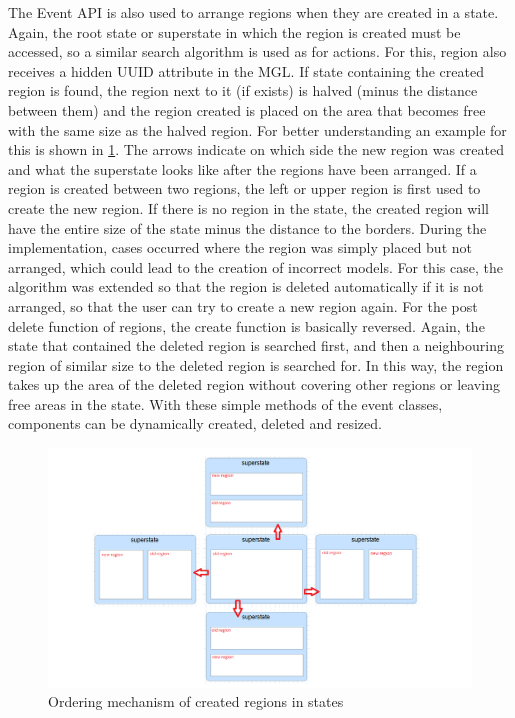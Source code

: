 The Event API is also used to arrange regions when they are created in a state. Again, the root state or superstate in which the region is created must be accessed, so a similar search algorithm is used as for actions. For this, region also receives a hidden UUID attribute in the MGL. If state containing the created region is found, the region next to it (if exists) is halved (minus the distance between them) and the region created is placed on the area that becomes free with the same size as the halved region. For better understanding an example for this is shown in \ref{fig:Event_region}. The arrows indicate on which side the new region was created and what the superstate looks like after the regions have been arranged. If a region is created between two regions, the left or upper region is first used to create the new region. If there is no region in the state, the created region will have the entire size of the state minus the distance to the borders. During the implementation, cases occurred where the region was simply placed but not arranged, which could lead to the creation of incorrect models. For this case, the algorithm was extended so that the region is deleted automatically if it is not arranged, so that the user can try to create a new region again. For the post delete function of regions, the create function is basically reversed. Again, the state that contained the deleted region is searched first, and then a neighbouring region of similar size to the deleted region is searched for. In this way, the region takes up the area of the deleted region without covering other regions or leaving free areas in the state. With these simple methods of the event classes, components can be dynamically created, deleted and resized.
\begin{figure}[h!]
\centering
\includegraphics[width=1.0\textwidth]{bilder/Event_region.png}
\caption{Ordering mechanism of created regions in states}
\label{fig:Event_region}
\end{figure} 

